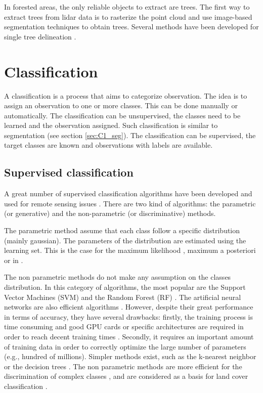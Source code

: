 In forested areas, the only reliable objects to extract are trees. The first way to extract trees from lidar data is to rasterize the point cloud and use image-based segmentation techniques to obtain trees. Several methods have been developed for single tree delineation \citep{dalponte2014tree, vega2014ptrees, kandare2014new}. 

\section{Classification}
\label{sec:C1_classif}
A classification is a process that aims to categorize observation. The idea is to assign an observation to one or more classes. This can be done manually or automatically. The classification can be unsupervised, the classes need to be learned and the observation assigned. Such classification is similar to segmentation (see section \ref{sec:C1_seg}). The classification can be supervised, the target classes are known and observations with labels are available.

\subsection{Supervised classification}
A great number of supervised classification algorithms have been developed and used for remote sensing issues \citep{landgrebe2005signal, lu2007survey, mather2016classification}. There are two kind of algorithms: the parametric (or generative) and the non-parametric (or discriminative) methods.

The parametric method assume that each class follow a specific distribution (mainly gaussian). The parameters of the distribution are estimated using the learning set. This is the case for the maximum likelihood \citep{strahler1980use}, maximum a posteriori \citep{fauvel2015fast} or in \cite{trias2005high}.

The non parametric methods do not make any assumption on the classes distribution. In this category of algorithms, the most popular are the Support Vector Machines (SVM) \citep{boser1992training, scholkopf2001learning} and the Random Forest (RF) \citep{breiman2001random}. The artificial neural networks are also efficient algorithms \citep{hepner1990artificial, atkinson1997mapping}. However, despite their great performance in terms of accuracy, they have several drawbacks: firstly, the training process is time consuming and good GPU cards or specific architectures are required in order to reach decent training times \citep{dean2012large, moritz2015sparknet}. Secondly, it requires an important amount of training data in order to correctly optimize the large number of parameters (e.g., hundred of millions). Simpler methods exist, such as the k-nearest neighbor \citep{indyk1998approximate} or the decision trees \citep{breiman1984classification}. The non parametric methods are more efficient  for the discrimination of complex classes \citep{paola1995review, foody2002status}, and are considered as a basis for land cover classification \citep{camps2009kernel}.

